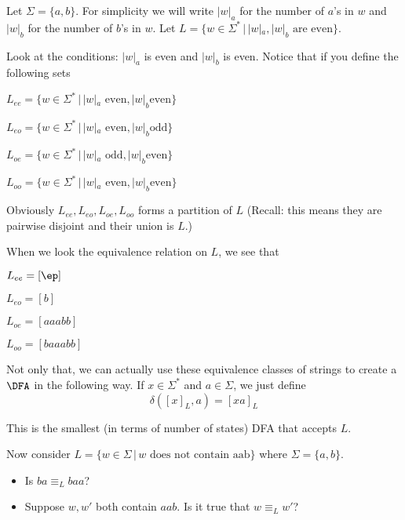 \begin{eg}
Let $\Sigma = \{a,b\}$. For simplicity we will write $|w|_a$ for the
number of $a$'s in $w$ and $|w|_b$ for the number of $b$'s in $w$.
Let $L = \{w \in \Sigma^* \,|\, |w|_a, |w|_b \text{ are even} \}$.

Look at the conditions: $|w|_a$ is even and $|w|_b$ is even. Notice
that if you define the following sets
 \begin{tightlist}
  \item $L_{ee} = \{w \in \Sigma^* \,|\, |w|_a \text{ even}, |w|_b \text{
  even}\}$
 \item $L_{eo} = \{w \in \Sigma^* \,|\, |w|_a \text{ even}, |w|_b \text{
  odd}\}$
  \item $L_{oe} = \{w \in \Sigma^* \,|\, |w|_a \text{ odd}, |w|_b \text{
  even}\}$
 \item $L_{oo} = \{w \in \Sigma^* \,|\, |w|_a \text{ even}, |w|_b \text{
  even}\}$
 \end{tightlist}

Obviously $L_{ee}, L_{eo}, L_{oe}, L_{oo}$ forms a partition of $L$
(Recall: this means they are pairwise disjoint and their union is
$L$.)

When we look the equivalence relation on $L$, we see that
 \begin{tightlist}
  \item $L_{ee} = [\ep]$
  \item $L_{eo} = [b]$
  \item $L_{oe} = [aaabb]$
  \item $L_{oo} = [baaabb]$
 \end{tightlist}

Not only that, we can actually use these equivalence classes of
strings to create a $\DFA$ in the following way. If $x \in \Sigma^*$
and $a \in \Sigma$, we just define
\[
  \delta([x]_L, a) = [xa]_L
\]

This is the smallest (in terms of number of states) DFA that accepts
$L$.
\end{eg}

\begin{eg}
Now consider $L = \{w \in \Sigma \,|\, w \text{ does not contain aab
}\}$ where $\Sigma = \{a,b\}$.
 \begin{itemize}
  \item Is $ba \equiv_L baa$?
  \item Suppose $w,w'$ both contain $aab$. Is it true that $w \equiv
 _L w'$?
 \end{itemize}
\end{eg}

